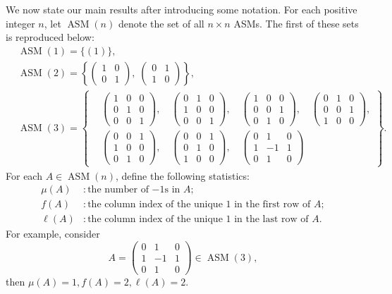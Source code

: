 \documentclass[12pt, a4paper]{amsart} %
\numberwithin{equation}{section}
\DeclareMathOperator{\ASM}{ASM}
\begin{document}
We now state our main results after introducing some notation. 
For each positive integer $n$, let $\ASM(n)$ denote the set of all $n\times n$ ASMs. 
The first of these sets is reproduced below:
$$
\begin{aligned}
&\ASM(1) = \bigl\{ (1) \bigr\}, \\
&\ASM(2) = \left\{
\begin{pmatrix} 1 & 0 \\ 0 & 1 \end{pmatrix},\;
\begin{pmatrix} 0 & 1 \\ 1 & 0 \end{pmatrix}
\right\}, \\
&\ASM(3) = \left\{
\begin{aligned}
& \begin{pmatrix} 1 & 0 & 0 \\ 0 & 1 & 0 \\ 0 & 0 & 1 \end{pmatrix},\quad
\begin{pmatrix} 0 & 1 & 0 \\ 1 & 0 & 0 \\ 0 & 0 & 1 \end{pmatrix},\quad
\begin{pmatrix} 1 & 0 & 0 \\ 0 & 0 & 1 \\ 0 & 1 & 0 \end{pmatrix},\quad
\begin{pmatrix} 0 & 1 & 0 \\ 0 & 0 & 1 \\ 1 & 0 & 0 \end{pmatrix}, \\
& \begin{pmatrix} 0 & 0 & 1 \\ 1 & 0 & 0 \\ 0 & 1 & 0 \end{pmatrix},\quad
\begin{pmatrix} 0 & 0 & 1 \\ 0 & 1 & 0 \\ 1 & 0 & 0 \end{pmatrix},\quad
\begin{pmatrix} 0 & 1 & 0 \\ 1 & -1 & 1 \\ 0 & 1 & 0 \end{pmatrix}
\end{aligned}
\right\}.
\end{aligned}
$$
%
For each $A \in \ASM(n)$, define the following statistics:
\begin{align*}
	\mu(A) &:  \text{the number of $-1$s in $A$}; \\
	f(A) &:  \text{the column index of the unique $1$ in the first row of $A$}; \\
	\ell(A) &: \text{the column index of the unique $1$ in the last row of $A$}.
\end{align*}
For example, consider 
$$A=\begin{pmatrix}
0 & 1 & 0 \\
1 & -1 & 1 \\
0 & 1 & 0
\end{pmatrix}\in \ASM(3),$$ 
then $\mu(A)=1,f(A)=2, \ell(A)=2$. 
\end{document}
